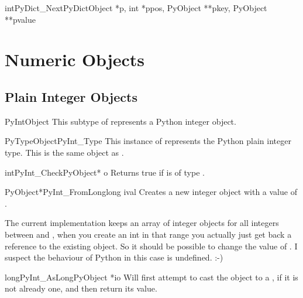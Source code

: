 \documentclass{manual}
\begin{document}
\begin{cfuncdesc}{int}{PyDict_Next}{PyDictObject *p, int *ppos,
                                    PyObject **pkey, PyObject **pvalue}

\end{cfuncdesc}


\section{Numeric Objects \label{numericObjects}}



\subsection{Plain Integer Objects \label{intObjects}}

\begin{ctypedesc}{PyIntObject}
This subtype of  represents a Python integer object.
\end{ctypedesc}

\begin{cvardesc}{PyTypeObject}{PyInt_Type}
This instance of  represents the Python plain 
integer type.  This is the same object as .
\end{cvardesc}

\begin{cfuncdesc}{int}{PyInt_Check}{PyObject* o}
Returns true if  is of type .
\end{cfuncdesc}

\begin{cfuncdesc}{PyObject*}{PyInt_FromLong}{long ival}
Creates a new integer object with a value of .

The current implementation keeps an array of integer objects for all
integers between  and , when you create an int in
that range you actually just get back a reference to the existing
object. So it should be possible to change the value of . I
suspect the behaviour of Python in this case is undefined. :-)
\end{cfuncdesc}

\begin{cfuncdesc}{long}{PyInt_AsLong}{PyObject *io}
Will first attempt to cast the object to a , if
it is not already one, and then return its value.
\end{cfuncdesc}
\end{document}
